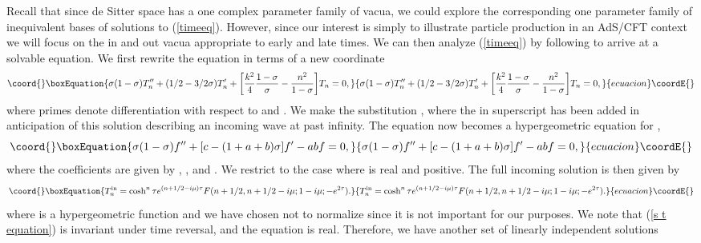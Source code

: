\documentclass[a4paper,aps,prd,preprintnumbers,groupedaddress]{revtex4}
\begin{document}
Recall that since de Sitter space has a one complex parameter family of vacua, we could explore the corresponding one parameter family of inequivalent bases of solutions to (\ref{timeeq}).  However, since our interest is simply to illustrate particle production in an AdS/CFT context we will focus on the in and out vacua appropriate to early and late times.  We can then analyze (\ref{timeeq}) by following \cite{bms01} to  arrive at a solvable equation.  We first rewrite the equation in terms of a new coordinate \coordHE{}
\begin{equation}\coord{}\boxEquation{
\sigma(1-\sigma) T_n ''  + (1/2 - 3/2 \sigma) T_n ' + \biggl[\frac{k^2}{4}\frac{1-\sigma}{\sigma} - \frac{n^2}{1-\sigma} \biggr] T_n =0 ,
}{
\sigma(1-\sigma) T_n ''  + (1/2 - 3/2 \sigma) T_n ' + \biggl[\frac{k^2}{4}\frac{1-\sigma}{\sigma} - \frac{n^2}{1-\sigma} \biggr] T_n =0 ,
}{ecuacion}\coordE{}\end{equation}
where primes denote differentiation with respect to \myHighlight{$\sigma$}\coordHE{} and \coordHE{}. We make the substitution \coordHE{}, where the in superscript has been added in anticipation of this solution describing an incoming wave at
past infinity. The equation now becomes a hypergeometric equation for \coordHE{},
\begin{equation}\coord{}\boxEquation{
\sigma(1-\sigma) f'' + [c-(1+a+b)\sigma]f' - ab f =0 ,
}{
\sigma(1-\sigma) f'' + [c-(1+a+b)\sigma]f' - ab f =0 ,
}{ecuacion}\coordE{}\end{equation}
where the coefficients are given by \coordHE{}, \coordHE{}, and \coordHE{}. We restrict to the case where \myHighlight{$\mu$}\coordHE{} is real and
positive. The full incoming solution is then given by
\begin{equation}\coord{}\boxEquation{ \label{bubble in solution}
T_n ^{\mathrm{in}} =  \cosh ^n \tau e^{(n+1/2 - i \mu) \tau} F(n+1/2, n+1/2-i \mu; 1-i\mu ; - e^{2 \tau} ) .
}{ T_n ^{\mathrm{in}} =  \cosh ^n \tau e^{(n+1/2 - i \mu) \tau} F(n+1/2, n+1/2-i \mu; 1-i\mu ; - e^{2 \tau} ) .
}{ecuacion}\coordE{}\end{equation}
where \coordHE{} is a hypergeometric function and we have chosen not to normalize since it is not important for our purposes. We note that (\ref{s
t equation}) is invariant under time reversal, and the equation is real. Therefore, we have another set of linearly independent solutions
\end{document}

